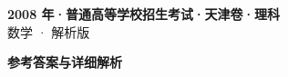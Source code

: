\documentclass[zihao=-4, a4paper]{ctexart}
\begin{document}
\begin{center}
  {\Large\bfseries 2008 年·普通高等学校招生考试·天津卷·理科}\\[4pt]
  {\large 数学 · 解析版}
\end{center}
\medskip
{}

\clearpage
{}
\begin{center}{\Large\bfseries 参考答案与详细解析}\end{center}
\medskip

\end{document}
